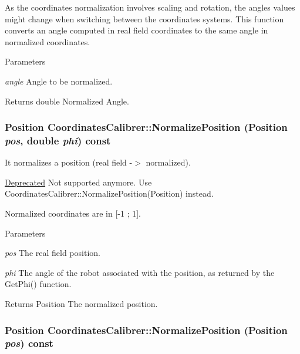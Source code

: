 As the coordinates normalization involves scaling and rotation, the angles values might change when switching between the coordinates systems. This function converts an angle computed in real field coordinates to the same angle in normalized coordinates.


\begin{DoxyParams}{Parameters}
\item[{\em angle}]Angle to be normalized. \end{DoxyParams}
\begin{DoxyReturn}{Returns}
double Normalized Angle. 
\end{DoxyReturn}
\hypertarget{classCoordinatesCalibrer_a034180f011c23565b9b5907ce0219fbf}{
\subsubsection[{NormalizePosition}]{\setlength{\rightskip}{0pt plus 5cm}Position CoordinatesCalibrer::NormalizePosition (Position {\em pos}, \/  double {\em phi}) const}}
\label{classCoordinatesCalibrer_a034180f011c23565b9b5907ce0219fbf}


It normalizes a position (real field -\/$>$ normalized). 

\begin{Desc}
\item[\hyperlink{deprecated__deprecated000001}{Deprecated}]Not supported anymore. Use CoordinatesCalibrer::NormalizePosition(Position) instead.\end{Desc}
Normalized coordinates are in \mbox{[}-\/1 ; 1\mbox{]}.


\begin{DoxyParams}{Parameters}
\item[{\em pos}]The real field position. \item[{\em phi}]The angle of the robot associated with the position, as returned by the GetPhi() function. \end{DoxyParams}
\begin{DoxyReturn}{Returns}
Position The normalized position. 
\end{DoxyReturn}
\hypertarget{classCoordinatesCalibrer_ad6519b69842756c256922d14d1e248ce}{
\subsubsection[{NormalizePosition}]{\setlength{\rightskip}{0pt plus 5cm}Position CoordinatesCalibrer::NormalizePosition (Position {\em pos}) const}}
\label{classCoordinatesCalibrer_ad6519b69842756c256922d14d1e248ce}


